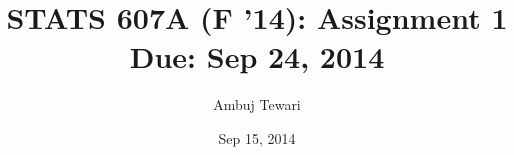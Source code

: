 \usepackage{fullpage}
\usepackage{amsmath,amssymb,amsthm}
\usepackage{url}
\usepackage[colorlinks=true]{hyperref}

\author{Ambuj Tewari}
\title{STATS 607A (F '14): Assignment 1\\
Due: Sep 24, 2014}
\date{Sep 15, 2014}
